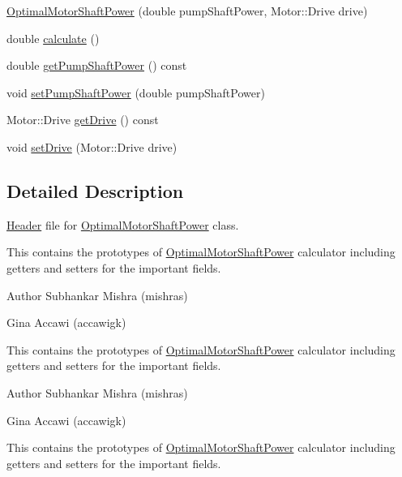 \begin{DoxyCompactItemize}
\hyperlink{class_optimal_motor_shaft_power_af0981673204c5f8a8cae26a8be8a8a5c}{Optimal\+Motor\+Shaft\+Power} (double pump\+Shaft\+Power, Motor\+::\+Drive drive)
\item 
double \hyperlink{class_optimal_motor_shaft_power_a34d47733928ae518fa6f3d08b7d8a12e}{calculate} ()
\item 
double \hyperlink{class_optimal_motor_shaft_power_aca7bb632c659ecf2ebf3cb9fdb23626f}{get\+Pump\+Shaft\+Power} () const
\item 
void \hyperlink{class_optimal_motor_shaft_power_ab2d80927fbaa62705359700b2a8f2f26}{set\+Pump\+Shaft\+Power} (double pump\+Shaft\+Power)
\item 
Motor\+::\+Drive \hyperlink{class_optimal_motor_shaft_power_a3cc369285d8b3582fcd8c44e5a1c37c8}{get\+Drive} () const
\item 
void \hyperlink{class_optimal_motor_shaft_power_a8f3288a69848c61f4e8e2b14da549d16}{set\+Drive} (Motor\+::\+Drive drive)
\end{DoxyCompactItemize}


\subsection{Detailed Description}
\hyperlink{class_header}{Header} file for \hyperlink{class_optimal_motor_shaft_power}{Optimal\+Motor\+Shaft\+Power} class. 

This contains the prototypes of \hyperlink{class_optimal_motor_shaft_power}{Optimal\+Motor\+Shaft\+Power} calculator including getters and setters for the important fields.

\begin{DoxyAuthor}{Author}
Subhankar Mishra (mishras) 

Gina Accawi (accawigk) 
\end{DoxyAuthor}


This contains the prototypes of \hyperlink{class_optimal_motor_shaft_power}{Optimal\+Motor\+Shaft\+Power} calculator including getters and setters for the important fields.

\begin{DoxyAuthor}{Author}
Subhankar Mishra (mishras) 

Gina Accawi (accawigk) 
\end{DoxyAuthor}


This contains the prototypes of \hyperlink{class_optimal_motor_shaft_power}{Optimal\+Motor\+Shaft\+Power} calculator including getters and setters for the important fields.

